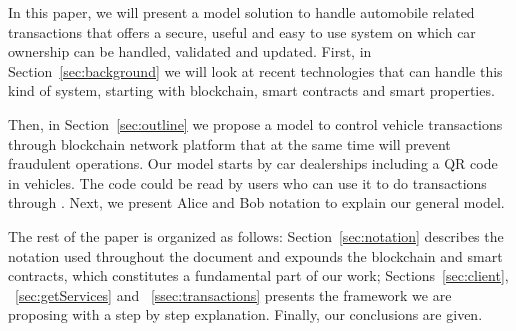 In this paper, 
we will present a model solution to handle automobile related transactions 
that offers a secure, useful and easy to use system on which car ownership can be
handled, validated and updated.
First, in Section~\ref{sec:background}
we will look at recent technologies that can handle this kind of system,
starting with blockchain, smart contracts and smart properties.


Then, in Section~\ref{sec:outline}
we propose a model to control vehicle transactions through blockchain network platform 
that at the same time will prevent fraudulent operations. 
Our model starts by car dealerships including a QR code in vehicles. 
The code could be read by users who can use it to do transactions through \blockchaincarnetwork. 
Next, 
we present Alice and Bob notation to explain our general model. 

The rest of the paper is organized as follows: 
Section~\ref{sec:notation} describes the notation used 
throughout the document and expounds the blockchain and smart contracts, 
which constitutes a fundamental part of our work; 
Sections~\ref{sec:client}, ~\ref{sec:getServices} and ~\ref{ssec:transactions} presents the framework we are proposing with a step by step explanation. 
Finally, our conclusions are given.